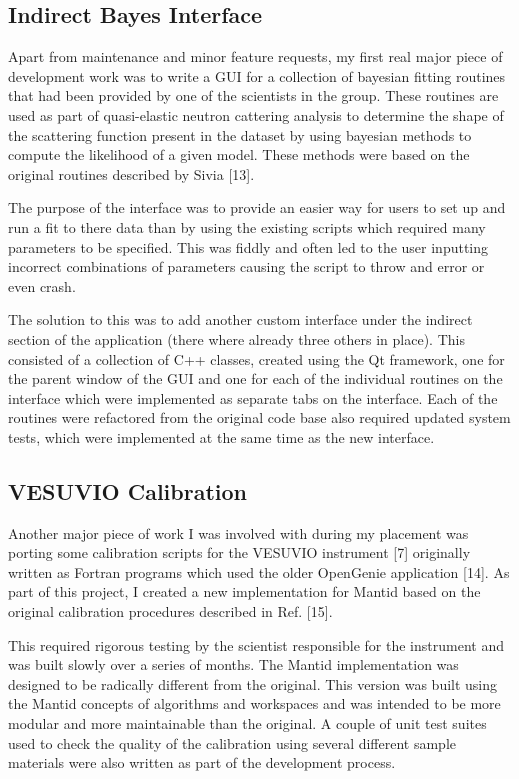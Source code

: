 \documentclass[paper=a4, fontsize=11pt]{scrartcl}	%
\numberwithin{equation}{section}															%
\numberwithin{figure}{section}																%
\numberwithin{table}{section}
\begin{document}
\subsection{Indirect Bayes Interface}\label{indirect-bayes-interface}

Apart from maintenance and minor feature requests, my first real major
piece of development work was to write a GUI for a collection of
bayesian fitting routines that had been provided by one of the
scientists in the group. These routines are used as part of
quasi-elastic neutron cattering analysis to determine the shape of the
scattering function present in the dataset by using bayesian methods to
compute the likelihood of a given model. These methods were based on the
original routines described by Sivia {[}13{]}.

The purpose of the interface was to provide an easier way for users to
set up and run a fit to there data than by using the existing scripts
which required many parameters to be specified. This was fiddly and
often led to the user inputting incorrect combinations of parameters
causing the script to throw and error or even crash.

The solution to this was to add another custom interface under the
indirect section of the application (there where already three others in
place). This consisted of a collection of C++ classes, created using the
Qt framework, one for the parent window of the GUI and one for each of
the individual routines on the interface which were implemented as
separate tabs on the interface. Each of the routines were refactored
from the original code base also required updated system tests, which
were implemented at the same time as the new interface.

\subsection{VESUVIO Calibration}\label{vesuvio-calibration}

Another major piece of work I was involved with during my placement was
porting some calibration scripts for the VESUVIO instrument {[}7{]}
originally written as Fortran programs which used the older OpenGenie
application {[}14{]}. As part of this project, I created a new
implementation for Mantid based on the original calibration procedures
described in Ref. {[}15{]}.

This required rigorous testing by the scientist responsible for the
instrument and was built slowly over a series of months. The Mantid
implementation was designed to be radically different from the original.
This version was built using the Mantid concepts of algorithms and
workspaces and was intended to be more modular and more maintainable
than the original. A couple of unit test suites used to check the
quality of the calibration using several different sample materials were
also written as part of the development process.
\end{document}
